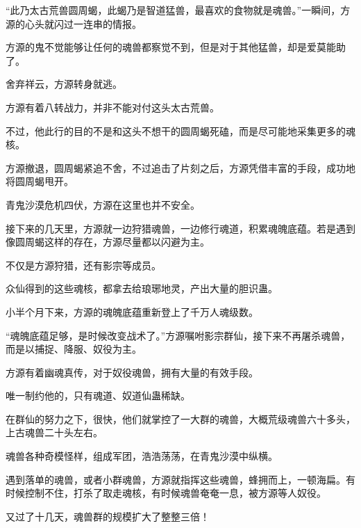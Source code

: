 \begin{this_body}
“此乃太古荒兽圆周蝎，此蝎乃是智道猛兽，最喜欢的食物就是魂兽。”一瞬间，方源的心头就闪过一连串的情报。

方源的鬼不觉能够让任何的魂兽都察觉不到，但是对于其他猛兽，却是爱莫能助了。

舍弃祥云，方源转身就逃。

方源有着八转战力，并非不能对付这头太古荒兽。

不过，他此行的目的不是和这头不想干的圆周蝎死磕，而是尽可能地采集更多的魂核。

方源撤退，圆周蝎紧追不舍，不过追击了片刻之后，方源凭借丰富的手段，成功地将圆周蝎甩开。

青鬼沙漠危机四伏，方源在这里也并不安全。

接下来的几天里，方源就一边狩猎魂兽，一边修行魂道，积累魂魄底蕴。若是遇到像圆周蝎这样的存在，方源尽量都以闪避为主。

不仅是方源狩猎，还有影宗等成员。

众仙得到的这些魂核，都拿去给琅琊地灵，产出大量的胆识蛊。

小半个月下来，方源的魂魄底蕴重新登上了千万人魂级数。

“魂魄底蕴足够，是时候改变战术了。”方源嘱咐影宗群仙，接下来不再屠杀魂兽，而是以捕捉、降服、奴役为主。

方源有着幽魂真传，对于奴役魂兽，拥有大量的有效手段。

唯一制约他的，只有魂道、奴道仙蛊稀缺。

在群仙的努力之下，很快，他们就掌控了一大群的魂兽，大概荒级魂兽六十多头，上古魂兽二十头左右。

魂兽各种奇模怪样，组成军团，浩浩荡荡，在青鬼沙漠中纵横。

遇到落单的魂兽，或者小群魂兽，方源就指挥这些魂兽，蜂拥而上，一顿海扁。有时候控制不住，打杀了取走魂核，有时候魂兽奄奄一息，被方源等人奴役。

又过了十几天，魂兽群的规模扩大了整整三倍！

\end{this_body}

